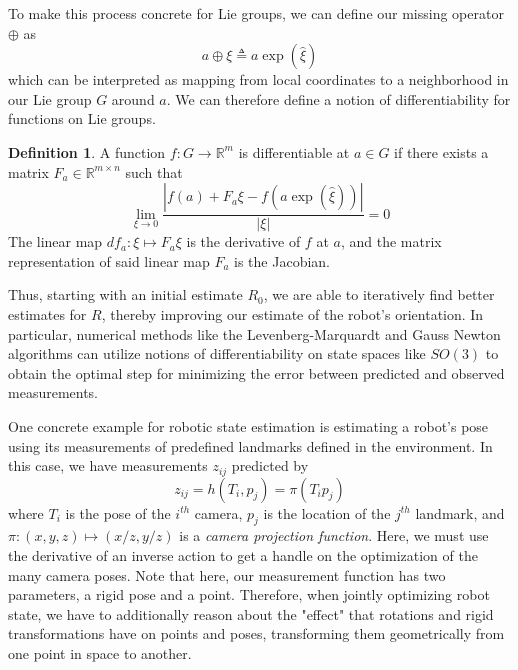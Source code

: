 \documentclass[reqno]{amsart}
\theoremstyle{definition}
\newtheorem{defn}{Definition}[section]
\numberwithin{equation}{section}
\begin{document}
To make this process concrete for Lie groups, we can define our missing operator $\oplus$ as
\begin{equation}
    a \oplus \xi \triangleq a\exp(\hat\xi)
\end{equation}
which can be interpreted as mapping from local coordinates to a neighborhood in our Lie group $G$ around $a$. We can therefore define a notion of differentiability for functions on Lie groups.

\begin{defn}
    A function $f : G \to \mathbb{R}^m$ is differentiable at $a \in G$ if there exists a matrix $F_a \in \mathbb{R}^{m \times n}$ such that
    \begin{equation*}
        \lim_{\xi \to 0} \frac{|f(a) + F_a\xi - f(a\exp(\hat\xi))|}{|\xi|} = 0
    \end{equation*}
    The linear map $df_a : \xi \mapsto F_a\xi$ is the derivative of $f$ at $a$, and the matrix representation of said linear map $F_a$ is the Jacobian.
\end{defn}

Thus, starting with an initial estimate $R_0$, we are able to iteratively find better estimates for $R$, thereby improving our estimate of the robot's orientation. In particular, numerical methods like the Levenberg-Marquardt and Gauss Newton algorithms can utilize notions of differentiability on state spaces like $SO(3)$ to obtain the optimal step for minimizing the error between predicted and observed measurements.

One concrete example for robotic state estimation is estimating a robot's pose using its measurements of predefined landmarks defined in the environment. In this case, we have measurements $z_{ij}$ predicted by
\begin{equation*}
    z_{ij} = h(T_i, p_j) = \pi(T_ip_j)
\end{equation*}
where $T_i$ is the pose of the $i^{th}$ camera, $p_j$ is the location of the $j^{th}$ landmark, and $\pi : (x, y, z) \mapsto (x/z, y/z)$ is a \textit{camera projection function}. Here, we must use the derivative of an inverse action to get a handle on the optimization of the many camera poses. Note that here, our measurement function has two parameters, a rigid pose and a point. Therefore, when jointly optimizing robot state, we have to additionally reason about the "effect" that rotations and rigid transformations have on points and poses, transforming them geometrically from one point in space to another.
\end{document}
